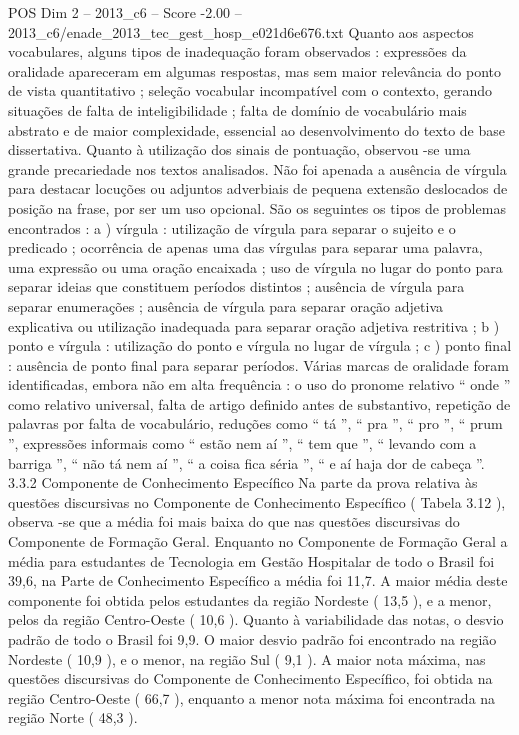 \begin{textsample}{POS Dim 2 – 2013\_c6 – Score -2.00 – 2013\_c6/enade\_2013\_tec\_gest\_hosp\_e021d6e676.txt}
Quanto aos aspectos vocabulares, alguns tipos de inadequação foram observados : expressões da oralidade apareceram em algumas respostas, mas sem maior relevância do ponto de vista quantitativo ; seleção vocabular incompatível com o contexto, gerando situações de falta de inteligibilidade ; falta de domínio de vocabulário mais abstrato e de maior complexidade, essencial ao desenvolvimento do texto de base dissertativa.
Quanto à utilização dos sinais de pontuação, observou -se uma grande precariedade nos textos analisados.
Não foi apenada a ausência de vírgula para destacar locuções ou adjuntos adverbiais de pequena extensão deslocados de posição na frase, por ser um uso opcional.
São os seguintes os tipos de problemas encontrados : a ) vírgula : utilização de vírgula para separar o sujeito e o predicado ; ocorrência de apenas uma das vírgulas para separar uma palavra, uma expressão ou uma oração encaixada ; uso de vírgula no lugar do ponto para separar ideias que constituem períodos distintos ; ausência de vírgula para separar enumerações ; ausência de vírgula para separar oração adjetiva explicativa ou utilização inadequada para separar oração adjetiva restritiva ; b ) ponto e vírgula : utilização do ponto e vírgula no lugar de vírgula ; c ) ponto final : ausência de ponto final para separar períodos.
Várias marcas de oralidade foram identificadas, embora não em alta frequência : o uso do pronome relativo “ onde ” como relativo universal, falta de artigo definido antes de substantivo, repetição de palavras por falta de vocabulário, reduções como “ tá ”, “ pra ”, “ pro ”, “ prum ”, expressões informais como “ estão nem aí ”, “ tem que ”, “ levando com a barriga ”, “ não tá nem aí ”, “ a coisa fica séria ”, “ e aí haja dor de cabeça ”. 3.3.2 Componente de Conhecimento Específico Na parte da prova relativa às questões discursivas no Componente de Conhecimento Específico ( Tabela 3.12 ), observa -se que a média foi mais baixa do que nas questões discursivas do Componente de Formação Geral.
Enquanto no Componente de Formação Geral a média para estudantes de Tecnologia em Gestão Hospitalar de todo o Brasil foi 39,6, na Parte de Conhecimento Específico a média foi 11,7.
A maior média deste componente foi obtida pelos estudantes da região Nordeste ( 13,5 ), e a menor, pelos da região Centro-Oeste ( 10,6 ).
Quanto à variabilidade das notas, o desvio padrão de todo o Brasil foi 9,9.
O maior desvio padrão foi encontrado na região Nordeste ( 10,9 ), e o menor, na região Sul ( 9,1 ).
A maior nota máxima, nas questões discursivas do Componente de Conhecimento Específico, foi obtida na região Centro-Oeste ( 66,7 ), enquanto a menor nota máxima foi encontrada na região Norte ( 48,3 ).

\end{textsample}
